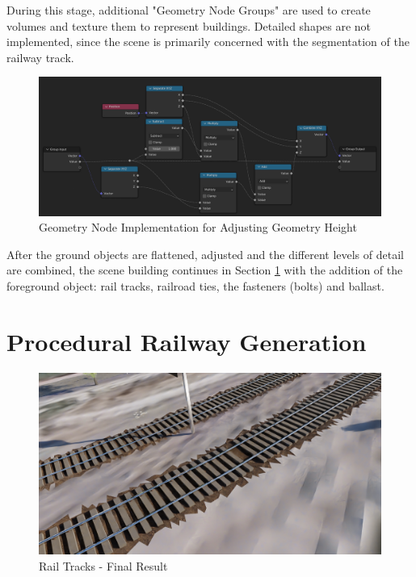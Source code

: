 During this stage, additional "Geometry Node Groups" are used to create volumes and texture them to represent buildings. Detailed shapes are not implemented, since the scene is primarily concerned with the segmentation of the railway track.

\begin{figure}[H]
    \centering
    \includegraphics[width=14.5cm]{src/img/pic/pic-4 blender geometry node screenshot adjust_z_to_match_pos.png}
    \caption{Geometry Node Implementation for Adjusting Geometry Height}
    \label{fig:impl-adjust-z-to-match-pos}
\end{figure}

After the ground objects are flattened, adjusted and the different levels of detail are combined, the scene building continues in Section \ref{sec:procedural-railway-generation} with the addition of the foreground object: rail tracks, railroad ties, the fasteners (bolts) and ballast.


\section{Procedural Railway Generation}
\label{sec:procedural-railway-generation}


\begin{figure}[H]
    \centering
    \includegraphics[width=.95\textwidth]{src/img/procedural-tracks/3b-rails-result.png}
    \caption{Rail Tracks - Final Result}
    \label{fig:track-final-result}
\end{figure}

